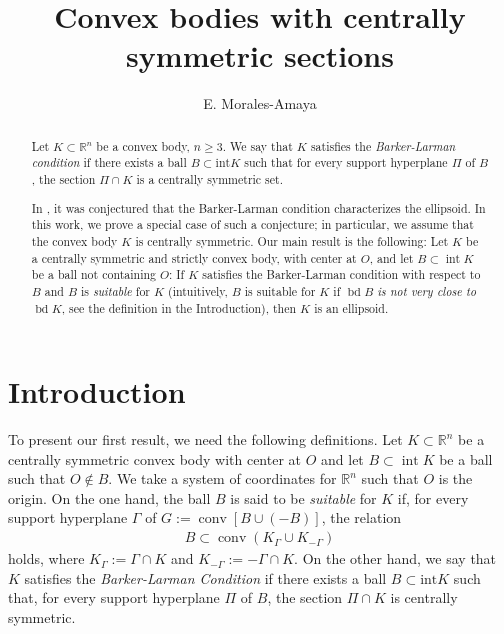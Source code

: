 \documentclass[12pt]{amsart}
\title {Convex bodies with centrally symmetric sections}
\author{E. Morales-Amaya}
\newcommand{\inte}{\operatorname*{int}}
\newcommand{\bd}{\operatorname*{bd}}
\newcommand{\conv}{\operatorname*{conv}}
\newcommand{\Rn}{\mathbb{R}^{n}}
\begin{document}
 \begin{abstract}  
                  Let $K\subset \mathbb{R}^n$ be a convex body, $n\geq 3$. We say that $K$ 
                  satisfies the \textit{Barker-Larman condition} if there exists a ball 
                  $B\subset \text{int} K$ such that for every suppor\-t hyperplane $\Pi$ of $B$, 
                  the section $\Pi \cap K$ is a centrally symmetric set. 
                  
                   In \cite{Barker}, it was conjectured that the Barker-Larman condition characterizes the 
                   e\-llip\-soid. In this work, we prove a special case of such a conjecture; in particular, we 
                   assume that the convex body $K$ is centrally symmetric. Our main result is
                  the following: Let $K$ be a centrally symmetric and strictly convex body,    
                   with center at $O$, and let $B\subset \inte K$ be a ball not containing $O$: If $K$  
                   satisfies the Barker-Larman condition with respect to $B$ and $B$ is \textit{suitable} 
                   for $K$ (intuitively, $B$ is suitable for $K$ if $\bd B$ \textit{is not very close to} $\bd K$, 
                   see the definition in the Introduction), then $K$ is an ellipsoid. 
\end{abstract}
\maketitle

\section{Introduction}
 
 
                  To present our first result, we need the following definitions. 
                  Let $K\subset \mathbb{R}^n$ be a centrally symmetric convex body with center at 
                  $O$ and let $B \subset \inte K$ be a ball such that $O\notin B$. We take a system 
                  of coordinates for $\Rn$ such that $O$ is the origin. On the one hand, the ball $B$ is 
                  said to be \textit{suitable} for $K$ if, for every support hyperplane 
                  $\Gamma$ of   $G:=\conv[B\cup (-B)]$, the relation
\begin{eqnarray}\label{jazzu}
                  B\subset \conv (K_{\Gamma} \cup K_{-\Gamma} )  
\end{eqnarray} 
                  holds, where $K_{\Gamma}:=\Gamma \cap K $ and 
                  $K_{-\Gamma}:=-\Gamma \cap K $. On the other hand, we say that $K$ satisfies 
                  the \textit{Barker-Larman Condition} if there exists a ball $B\subset \text{int} K$ such 
                  that, for every support hyperplane $\Pi$ of $B$, the section $\Pi \cap K$ is 
                  centrally symmetric.    
 
\end{document}
